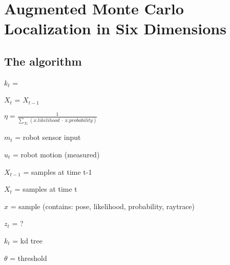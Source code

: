 \documentclass[Thesis.tex]{subfiles}
\begin{document}
\chapter{Augmented Monte Carlo Localization in Six Dimensions}

\section{The algorithm}

\begin{algorithm}


 {

\BlankLine

$k_t$ = 

\BlankLine

$X_t$ = $X_{t-1}$\;

\BlankLine

$\eta = \frac{1}{ \sum\limits_{X_{t}}{\left( x.likelihood\ \cdot\ x.probability\right) } }$\;

\BlankLine


\BlankLine

\;


}

\end{algorithm}

$m_{t}$ = robot sensor input

$u_{t}$ = robot motion (measured)

$X_{t-1}$ = samples at time t-1

$X_{t}$ = samples at time t

$x$ = sample (contains: pose, likelihood, probability, raytrace)

$z_{t}$ = ?

$k_{t}$ = kd tree

$\theta$ = threshold
\end{document}
